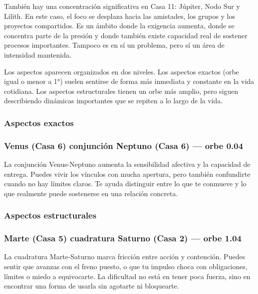 \documentclass[11pt,a4paper]{article}\usepackage[utf8]{inputenc}
\begin{document}
También hay una concentración significativa en Casa 11: Júpiter, Nodo Sur y Lilith. En este caso, el foco se desplaza hacia las amistades, los grupos y los proyectos compartidos. Es un ámbito donde la exigencia aumenta, donde se concentra parte de la presión y donde también existe capacidad real de sostener procesos importantes. Tampoco es en sí un problema, pero sí un área de intensidad mantenida.



Los aspectos aparecen organizados en dos niveles. Los aspectos exactos (orbe igual o menor a 1°) suelen sentirse de forma más inmediata y constante en la vida cotidiana. Los aspectos estructurales tienen un orbe más amplio, pero siguen describiendo dinámicas importantes que se repiten a lo largo de la vida.



\vspace{0.8cm}
\subsubsection*{Aspectos exactos}
\subsubsection*{Venus (Casa 6) conjunción Neptuno (Casa 6) --- orbe 0.04\textdegree}
La conjunción Venus-Neptuno aumenta la sensibilidad afectiva y la capacidad de entrega. Puedes vivir los vínculos con mucha apertura, pero también confundirte cuando no hay límites claros. Te ayuda distinguir entre lo que te conmueve y lo que realmente puede sostenerse en una relación concreta.

\vspace{0.8cm}
\subsubsection*{Aspectos estructurales}
\subsubsection*{Marte (Casa 5) cuadratura Saturno (Casa 2) --- orbe 1.04\textdegree}
La cuadratura Marte-Saturno marca fricción entre acción y contención. Puedes sentir que avanzas con el freno puesto, o que tu impulso choca con obligaciones, límites o miedo a equivocarte. La dificultad no está en tener poca fuerza, sino en encontrar una forma de usarla sin agotarte ni bloquearte.
\end{document}
